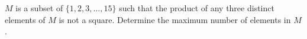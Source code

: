 $M$ is a subset of $\{1, 2, 3, \ldots, 15\}$ such that the product of any three distinct elements of $M$ is not a square. Determine the maximum number of elements in $M$.
